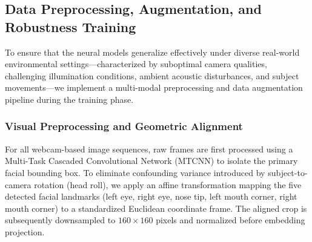 \documentclass[journal]{IEEEtran}
\begin{document}
\subsection{Data Preprocessing, Augmentation, and Robustness Training}
\label{subsec:preprocessing_aug}

To ensure that the neural models generalize effectively under diverse real-world environmental settings---characterized by suboptimal camera qualities, challenging illumination conditions, ambient acoustic disturbances, and subject movements---we implement a multi-modal preprocessing and data augmentation pipeline during the training phase.

\subsubsection{Visual Preprocessing and Geometric Alignment}
For all webcam-based image sequences, raw frames are first processed using a Multi-Task Cascaded Convolutional Network (MTCNN) to isolate the primary facial bounding box. To eliminate confounding variance introduced by subject-to-camera rotation (head roll), we apply an affine transformation mapping the five detected facial landmarks (left eye, right eye, nose tip, left mouth corner, right mouth corner) to a standardized Euclidean coordinate frame. The aligned crop is subsequently downsampled to $160 \times 160$ pixels and normalized before embedding projection.
\end{document}
